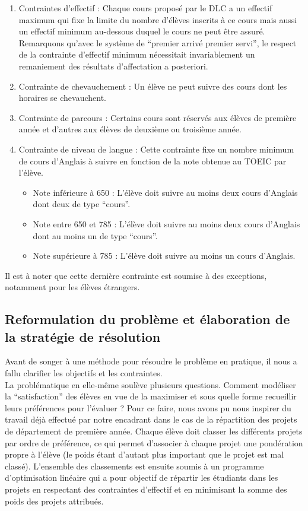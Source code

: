 \documentclass[12pt]{article}
\begin{document}
    \begin{enumerate}
        \item Contraintes d’effectif : Chaque cours proposé par le DLC a un effectif maximum qui fixe la limite du nombre d’élèves inscrits à ce cours mais aussi un effectif minimum au-dessous duquel le cours ne peut être assuré. Remarquons qu’avec le système de “premier arrivé premier servi”, le respect de la contrainte d’effectif minimum nécessitait invariablement un remaniement des résultats d’affectation a posteriori. 
        \item Contrainte de chevauchement : Un élève ne peut suivre des cours dont les horaires se chevauchent. 
        \item Contrainte de parcours : Certains cours sont réservés aux élèves de première année et d’autres aux élèves de deuxième ou troisième année. 
        \item Contrainte de niveau de langue : Cette contrainte fixe un nombre minimum de cours d’Anglais à suivre en fonction de la note obtenue au TOEIC par l’élève. 
        \begin{itemize}
          \item Note inférieure à 650 : L’élève doit suivre au moins deux cours d’Anglais dont deux de type “cours”. 
          \item Note entre 650 et 785 : L’élève doit suivre au moins deux cours d’Anglais dont au moins un de type “cours”. 
          \item Note supérieure à 785 : L’élève doit suivre au moins un cours d’Anglais. 
        \end{itemize}
    \end{enumerate}

    Il est à noter que cette dernière contrainte est soumise à des exceptions, notamment pour les élèves étrangers. 
    
      \subsection{Reformulation du problème et élaboration de la stratégie de résolution}

Avant de songer à une méthode pour résoudre le problème en pratique, il nous a fallu clarifier les objectifs et les contraintes. \\

La problématique en elle-même soulève plusieurs questions. Comment modéliser la “satisfaction” des élèves en vue de la maximiser et sous quelle forme recueillir leurs préférences pour l’évaluer ? Pour ce faire, nous avons pu nous inspirer du travail déjà effectué par notre encadrant dans le cas de la répartition des projets de département de première année. Chaque élève doit classer les différents projets par ordre de préférence, ce qui permet d’associer à chaque projet une pondération propre à l’élève (le poids étant d’autant plus important que le projet est mal classé). L’ensemble des classements est ensuite soumis à un programme d’optimisation linéaire qui a pour objectif de répartir les étudiants dans les projets en respectant des contraintes d’effectif et en minimisant la somme des poids des projets attribués.  \\
\end{document}
